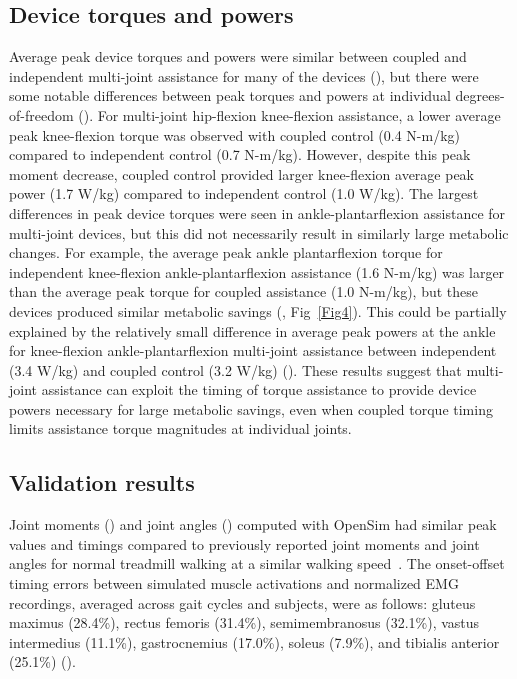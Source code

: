 \documentclass[10pt,letterpaper]{article}
\begin{document}
\subsection*{Device torques and powers}
Average peak device torques and powers were similar between coupled and independent multi-joint assistance for many of the devices (), but there were some notable differences between peak torques and powers at individual degrees-of-freedom (). For multi-joint hip-flexion knee-flexion assistance, a lower average peak knee-flexion torque was observed with coupled control (0.4 N-m/kg) compared to independent control (0.7 N-m/kg). However, despite this peak moment decrease, coupled control provided larger knee-flexion average peak power (1.7 W/kg) compared to independent control (1.0 W/kg). The largest differences in peak device torques were seen in ankle-plantarflexion assistance for multi-joint devices, but this did not necessarily result in similarly large metabolic changes. For example, the average peak ankle plantarflexion torque for independent knee-flexion ankle-plantarflexion assistance (1.6 N-m/kg) was larger than the average peak torque for coupled assistance (1.0 N-m/kg), but these devices produced similar metabolic savings (, Fig~\ref{Fig4}). This could be partially explained by the relatively small difference in average peak powers at the ankle for knee-flexion ankle-plantarflexion multi-joint assistance between independent (3.4 W/kg) and coupled control (3.2 W/kg) (). These results suggest that multi-joint assistance can exploit the timing of torque assistance to provide device powers necessary for large metabolic savings, even when coupled torque timing limits assistance torque magnitudes at individual joints.

\subsection*{Validation results}
Joint moments () and joint angles () computed with OpenSim had similar peak values and timings compared to previously reported joint moments and joint angles for normal treadmill walking at a similar walking speed~\cite{Silder:2013}. The onset-offset timing errors between simulated muscle activations and normalized EMG recordings, averaged across gait cycles and subjects, were as follows: gluteus maximus (28.4\%), rectus femoris (31.4\%), semimembranosus (32.1\%), vastus intermedius (11.1\%), gastrocnemius (17.0\%), soleus (7.9\%), and tibialis anterior (25.1\%) ().
\end{document}
